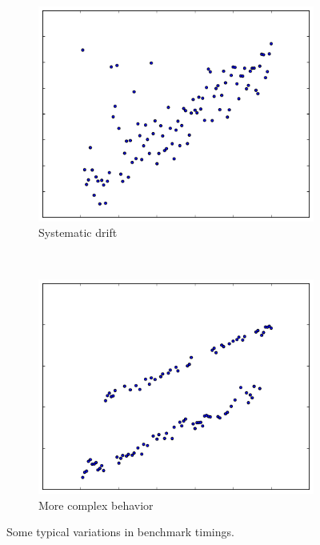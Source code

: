 \documentclass[conference]{IEEEtran}
\begin{document}
\begin{figure}
\begin{subfigure}{0.22\textwidth}
    \centering
    \includegraphics[width=\textwidth]{figures/fig1/drift_manyallocs_slow}
    \caption{Systematic drift}
\end{subfigure}
~
\begin{subfigure}{0.22\textwidth}
    \centering
    \includegraphics[width=\textwidth]{figures/fig1/bimodal_drift_sumindex}
    \caption{More complex behavior}
\end{subfigure}

\caption{Some typical variations in benchmark timings.}
\label{fig:examplebenchmarks}
\end{figure}
\end{document}
